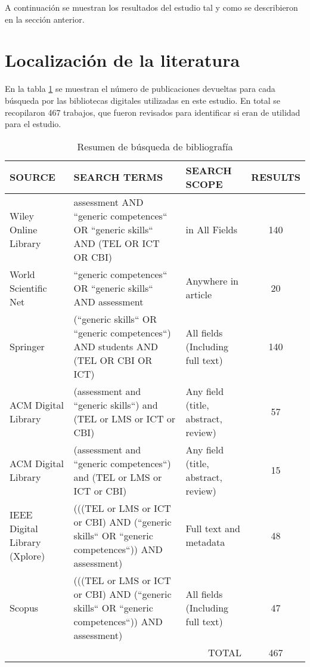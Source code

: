 


A continuación se muestran los resultados del estudio tal y como se describieron en la sección anterior.

\section{Localización de la literatura}
En la tabla \ref{tab:ResumenBusquedaResultados} se muestran el número de publicaciones devueltas para cada búsqueda por las bibliotecas digitales utilizadas en este estudio. En total se recopilaron 467 trabajos, que fueron revisados para identificar si eran de utilidad para el estudio. 

\begin{table}[H]
  \begin{center}
  \begin{tabular}{| m{3.5cm} | m{6cm} | m{3cm} | c |}
    \hline
    SOURCE & SEARCH TERMS & SEARCH SCOPE & RESULTS\\
    \hline
    \hline
    Wiley Online Library & assessment AND ``generic competences`` OR ``generic skills`` AND (TEL OR ICT OR CBI) & in All Fields & 140 \\
    \hline
    World Scientific Net & ``generic competences`` OR ``generic skills`` AND assessment & Anywhere in article & 20\\
    \hline
    Springer & (``generic skills`` OR ``generic competences``) AND  students AND (TEL OR CBI OR ICT) & All fields (Including full text) & 140\\
    \hline
    ACM Digital Library & (assessment and ``generic skills``) and (TEL or LMS or ICT or CBI) & Any field (title, abstract, review) & 57\\
    \hline
    ACM Digital Library & (assessment and ``generic competences``) and (TEL or LMS or ICT or CBI) & Any field (title, abstract, review) & 15\\
    \hline
    IEEE Digital Library (Xplore) & (((TEL or LMS or ICT or CBI) AND (``generic skills`` OR ``generic competences``)) AND assessment) & Full text and metadata & 48\\
    \hline
    Scopus & (((TEL or LMS or ICT or CBI) AND (``generic skills`` OR ``generic competences``)) AND assessment) & All fields (Including full text) & 47\\
    \hline
    \multicolumn{3}{|r|}{TOTAL} & 467\\
    \hline
  \end{tabular}
\end{center}
\caption{Resumen de búsqueda de bibliografía}
\label{tab:ResumenBusquedaResultados}
\end{table} 


